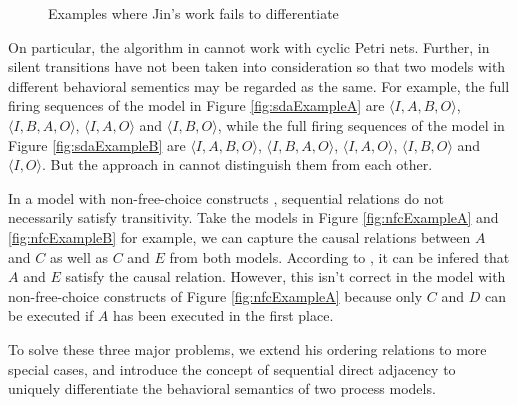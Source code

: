 \documentclass[dvips,...]{llncs}
\begin{document}
\begin{figure}[htbp]
{\begin{minipage}[b]{0.45\textwidth}
	\end{minipage}
	\label{fig:nfcExampleA}
}
\caption{Examples where Jin's work fails to differentiate\label{fig:drawbacks}}
\end{figure}

On particular, the algorithm in \cite{jin2014computing} cannot work with cyclic Petri nets. Further, in \cite{jin2014computing} silent transitions have not been taken into consideration so that two models with different behavioral sementics may be regarded as the same. For example, the full firing sequences of the model in Figure \ref{fig:sdaExampleA} are $\langle I,A,B,O\rangle$, $\langle I,B,A,O\rangle$, $\langle I,A,O\rangle$ and $\langle I,B,O\rangle$, while the full firing sequences of the model in Figure \ref{fig:sdaExampleB} are $\langle I,A,B,O\rangle$, $\langle I,B,A,O\rangle$, $\langle I,A,O\rangle$, $\langle I,B,O\rangle$ and $\langle I,O\rangle$. But the approach in \cite{jin2014computing} cannot distinguish them from each other.

In a model with non-free-choice constructs \cite{de2003workflow}, sequential relations do not necessarily satisfy transitivity. Take the models in Figure \ref{fig:nfcExampleA} and \ref{fig:nfcExampleB} for example, we can capture the causal relations between $A$ and $C$ as well as $C$ and $E$ from both models. According to \cite{jin2014computing}, it can be infered that $A$ and $E$ satisfy the causal relation. However, this isn't correct in the model with non-free-choice constructs of Figure \ref{fig:nfcExampleA} because only $C$ and $D$ can be executed if $A$ has been executed in the first place.

To solve these three major problems, we extend his ordering relations to more special cases, and introduce the concept of sequential direct adjacency to uniquely differentiate the behavioral semantics of two process models. %
\end{document}
